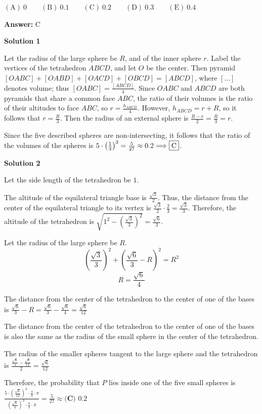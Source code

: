 \begin{enumerate}
 $\mathrm{(A) \ }0 \qquad \mathrm{(B) \ }0.1 \qquad \mathrm{(C) \ }0.2 \qquad \mathrm{(D) \ }0.3 \qquad \mathrm{(E) \ }0.4$

 \textbf{Answer: }C



\textbf{Solution 1}

Let the radius of the large sphere be $R$, and of the inner sphere $r$. Label the vertices of the tetrahedron $ABCD$, and let $O$ be the center. Then pyramid $[OABC] + [OABD] + [OACD] + [OBCD] = [ABCD]$, where $[\ldots]$ denotes volume; thus $[OABC] = \frac{[ABCD]}{4}$. Since $OABC$ and $ABCD$ are both pyramids that share a common face $ABC$, the ratio of their volumes is the ratio of their altitudes to face $ABC$, so $r = \frac {h_{ABCD}}4$. However, $h_{ABCD} = r + R$, so it follows that $r = \frac {R}{3}$. Then the radius of an external sphere is $\frac{R-r}2 = \frac {R}{3} = r$.

 Since the five described spheres are non-intersecting, it follows that the ratio of the volumes of the spheres is $5 \cdot \left( \frac 13 \right)^3 = \frac{5}{27} \approx 0.2 \Longrightarrow \fbox{C}$.

 



\textbf{Solution 2}

Let the side length of the tetrahedron be $1$.

 The altitude of the equilateral triangle base is $\frac{\sqrt{3}}{2}$. Thus, the distance from the center of the equilateral triangle to its vertex is $\frac{\sqrt{3}}{2} \cdot \frac 23 = \frac{\sqrt{3}}{3}$. Therefore, the altitude of the tetrahedron is $\sqrt{1^2-(\frac{\sqrt{3}}{3})^2} = \frac{\sqrt{6}}{3}$.

 Let the radius of the large sphere be $R$.
 \[(\frac{\sqrt{3}}{3})^2 + (\frac{\sqrt{6}}{3} - R)^2 = R^2\]
 \[R = \frac{\sqrt{6}}{4}\]

 The distance from the center of the tetrahedron to the center of one of the bases is $\frac{\sqrt{6}}{3} - R = \frac{\sqrt{6}}{3} - \frac{\sqrt{6}}{4} = \frac{\sqrt{6}}{12}$

 The distance from the center of the tetrahedron to the center of one of the bases is also the same as the radius of the small sphere in the center of the tetrahedron.

 The radius of the smaller spheres tangent to the large sphere and the tetrahedron is $\frac{\frac{\sqrt{6}}{4}-\frac{\sqrt{6}}{12}}{2} = \frac{\sqrt{6}}{12}$

 Therefore, the probability that $P$ lies inside one of the five small spheres is $\frac{5 \cdot (\frac{\sqrt{6}}{12})^3 \cdot \frac43 \cdot \pi }{(\frac{\sqrt{6}}{4})^3 \cdot \frac43 \cdot \pi} = \frac{5}{27} \approx \boxed{\textbf{(C) } 0.2}$




\end{enumerate}
